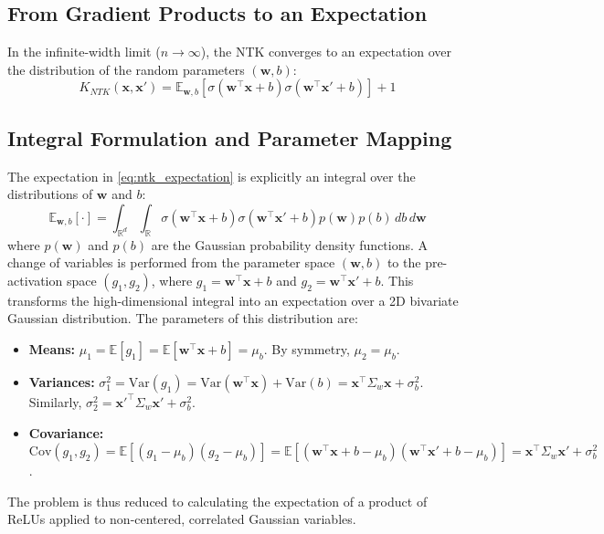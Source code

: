 \documentclass{article}
\begin{document}
\subsection{From Gradient Products to an Expectation}
In the infinite-width limit ($n \to \infty$), the NTK converges to an expectation over the distribution of the random parameters $(\bm{w}, b)$:
\begin{equation}
\label{eq:ntk_expectation}
    K_{NTK}(\bm{x}, \bm{x}') = \mathbb{E}_{\bm{w},b} \left[ \sigma(\bm{w}^\top \bm{x} + b)\sigma(\bm{w}^\top \bm{x}' + b) \right] + 1
\end{equation}

\subsection{Integral Formulation and Parameter Mapping}
The expectation in \eqref{eq:ntk_expectation} is explicitly an integral over the distributions of $\bm{w}$ and $b$:
\begin{equation}
    \mathbb{E}_{\bm{w},b}[\cdot] = \int_{\mathbb{R}^d} \int_{\mathbb{R}} \sigma(\bm{w}^\top \bm{x} + b)\sigma(\bm{w}^\top \bm{x}' + b) p(\bm{w})p(b) \,db \,d\bm{w}
\end{equation}
where $p(\bm{w})$ and $p(b)$ are the Gaussian probability density functions. A change of variables is performed from the parameter space $(\bm{w}, b)$ to the pre-activation space $(g_1, g_2)$, where $g_1 = \bm{w}^\top \bm{x} + b$ and $g_2 = \bm{w}^\top \bm{x}' + b$. This transforms the high-dimensional integral into an expectation over a 2D bivariate Gaussian distribution. The parameters of this distribution are:
\begin{itemize}
    \item \textbf{Means:} $\mu_1 = \mathbb{E}[g_1] = \mathbb{E}[\bm{w}^\top\bm{x} + b] = \mu_b$. By symmetry, $\mu_2 = \mu_b$.
    \item \textbf{Variances:} $\sigma_1^2 = \text{Var}(g_1) = \text{Var}(\bm{w}^\top\bm{x}) + \text{Var}(b) = \bm{x}^\top \Sigma_w \bm{x} + \sigma_b^2$. Similarly, $\sigma_2^2 = {\bm{x}'}^\top \Sigma_w \bm{x}' + \sigma_b^2$.
    \item \textbf{Covariance:} $\text{Cov}(g_1, g_2) = \mathbb{E}[(g_1-\mu_b)(g_2-\mu_b)] = \mathbb{E}[(\bm{w}^\top\bm{x} + b-\mu_b)(\bm{w}^\top\bm{x}' + b-\mu_b)] = \bm{x}^\top \Sigma_w \bm{x}' + \sigma_b^2$.
\end{itemize}
The problem is thus reduced to calculating the expectation of a product of ReLUs applied to non-centered, correlated Gaussian variables.
\end{document}
